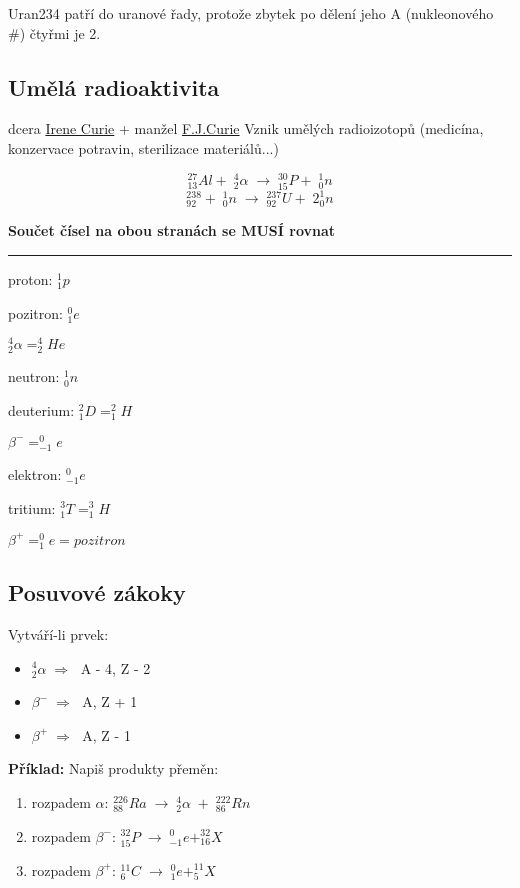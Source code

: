 Uran234 patří do uranové řady, protože zbytek po dělení jeho A (nukleonového \#) čtyřmi je 2.

\subsection{Umělá radioaktivita}
dcera \underline{Irene Curie} + manžel \underline{F.J.Curie}
Vznik umělých radioizotopů (medicína, konzervace potravin, sterilizace materiálů...)

\[^{27}_{13}Al + \; ^4_2\alpha \; \longrightarrow \; ^{30}_{15}P + \; ^1_0n\]
\vspace{1em}
\[^{238}_{92} +  \; ^1_0n \; \longrightarrow \; ^{237}_{92}U + \; 2^1_0n\]
\vspace{0.5em}

\textbf{Součet čísel na obou stranách se MUSÍ rovnat}

\rule{44em}{1px}

\begin{multicols}{3}
    \vspace{0.5em}
    proton: $^1_1p$
    
    \vspace{0.5em}
    pozitron: $^0_1e$
    
    \vspace{0.5em}
    $^4_2\alpha = ^4_2He$
    
    \vspace{0.5em}
    neutron: $^1_0n$
    
    deuterium: $^2_1D = ^2_1H$
    
    $\beta^{-} = ^0_{-1}e$
    
    elektron: $^0_{-1}e$
    
    tritium: $^3_1T = ^3_1H$
    
    $\beta^{+} = ^0_1e = pozitron$
\end{multicols}

\subsection{Posuvové zákoky}
Vytváří-li prvek:
\begin{itemize}
    \item $^4_2\alpha \; \Longrightarrow \;$ A - 4, Z - 2
    \item $\beta^- \; \Longrightarrow \;$ A, \;Z + 1
    \item $\beta^+ \; \Longrightarrow \;$ A, \;Z - 1
\end{itemize}
\textbf{Příklad:} Napiš produkty přeměn:
\begin{enumerate}
    \item rozpadem $\alpha$: \tab \(^{226}_{88}Ra \; \rightarrow \; ^4_2\alpha \; + \; ^{222}_{86}Rn\)
    \item rozpadem $\beta^-$: \tab \(^{32}_{15}P \; \rightarrow \; ^0_{-1}e + ^{32}_{16}X\)
    \item rozpadem $\beta^+$: \tab \(^{11}_{6}C \; \rightarrow \; ^0_{1}e + ^{11}_{5}X\)
\end{enumerate}


